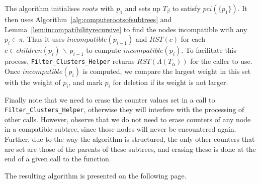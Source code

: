 \documentclass{article}
\newcommand{\leafset}{\Lambda}
\begin{document}
    The algorithm initialises $roots$ with $p_1$ and sets up $T_\beta$ to satisfy $pci(\{p_1\})$. It then uses Algorithm~\ref{alg:computerootsofsubtrees} and Lemma~\ref{lem:incompatibilityrecursive} to find the nodes incompatible with any $p_i \in \pi$. Thus it uses $incompatible(p_{i-1})$ and $RST(c)$ for each $c \in children(p_i)\, \backslash\, p_{i-1}$ to compute $incompatible(p_i)$. To facilitate this process, \texttt{Filter\_Clusters\_Helper} returns $RST(\leafset(T_\alpha))$ for the caller to use. Once $incompatible(p_i)$ is computed, we compare the largest weight in this set with the weight of $p_i$, and mark $p_i$ for deletion if its weight is not larger.

    Finally note that we need to erase the counter values set in a call to \texttt{Filter\_Clusters\_Helper}, otherwise they will interfere with the processing of other calls. However, observe that we do not need to erase counters of any node in a compatible subtree, since those nodes will never be encountered again. Further, due to the way the algorithm is structured, the only other counters that are set are those of the parents of these subtrees, and erasing these is done at the end of a given call to the function.

    The resulting algorithm is presented on the following page.
\end{document}
